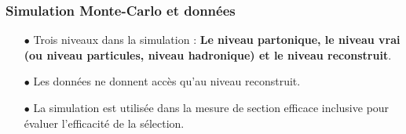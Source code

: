 \documentclass[usepdftitle=false,green]{beamer}
\begin{document}
\begin{frame}
	\frametitle{Simulation Monte-Carlo et données}
	\begin{figure}[t]
		\vspace{-5ex}
	\end{figure}
	\begin{itemize}
		\item[$\bullet$] Trois niveaux dans la simulation :
\textbf{Le niveau partonique, le niveau vrai ({\scriptsize ou niveau particules, niveau hadronique}) et le niveau reconstruit}.
		\item[$\bullet$] Les données ne donnent accès qu'au niveau
reconstruit.
		\item[$\bullet$] La simulation est utilisée dans la mesure de section efficace inclusive pour évaluer l'efficacité de la sélection.
	\end{itemize}
\end{frame}
\end{document}

